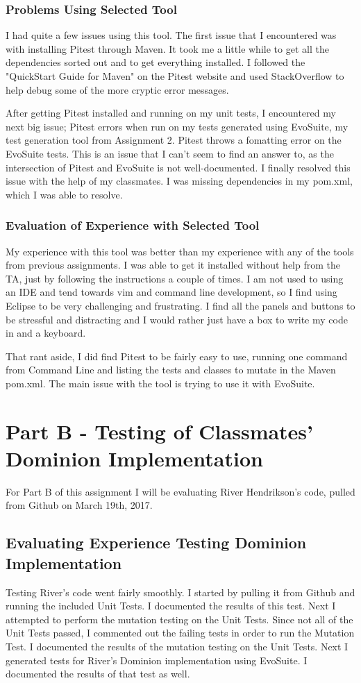\documentclass[letterpaper,10pt]{article}
\begin{document}
		\subsubsection{Problems Using Selected Tool}
		I had quite a few issues using this tool. The first issue that I encountered was with 
		installing Pitest through Maven. It took me a little while to get all the dependencies
		 sorted out and to get everything installed. I followed the "QuickStart Guide for 
		 Maven" on the Pitest website and used StackOverflow to help debug some of the more 
		 cryptic error messages.

		 After getting Pitest installed and running on my unit tests, I encountered my next 
		 big issue; Pitest errors when run on my tests generated using EvoSuite, my test 
		 generation tool from Assignment 2. Pitest throws a fomatting error on the EvoSuite 
		 tests. This is an issue that I can't seem to find an answer to, as the intersection 
		 of Pitest and EvoSuite is not well-documented. I finally resolved this issue with 
		 the help of my classmates. I was missing dependencies in my pom.xml, which I was 
		 able to resolve.
		\subsubsection{Evaluation of Experience with Selected Tool}
		My experience with this tool was better than my experience with any of the tools from 
		previous assignments. I was able to get it installed without help from the TA, just by
		 following the instructions a couple of times. I am not used to using an IDE and tend 
		towards vim and command line development, so I find using Eclipse to be very 
		challenging and frustrating. I find all the panels and buttons to be stressful and 
		distracting and I would rather just have a box to write my code in and a keyboard.

		That rant aside, I did find Pitest to be fairly easy to use, running one command from 
		Command Line and listing the tests and classes to mutate in the Maven pom.xml. The 
		main issue with the tool is trying to use it with EvoSuite.

\section{Part B - Testing of Classmates' Dominion Implementation}
For Part B of this assignment I will be evaluating River Hendrikson's code, pulled from Github 
on March 19th, 2017.
	\subsection{Evaluating Experience Testing Dominion Implementation}
	Testing River's code went fairly smoothly. I started by pulling it from Github and running
	 the included Unit Tests. I documented the results of this test. Next I attempted to 
	perform the mutation testing on the Unit Tests. Since not all of the Unit Tests passed, I 
	commented out the failing tests in order to run the Mutation Test. I documented the 
	results of the mutation testing on the Unit Tests. Next I generated tests for River's 
	Dominion implementation using EvoSuite. I documented the results of that test as well.
\end{document}
